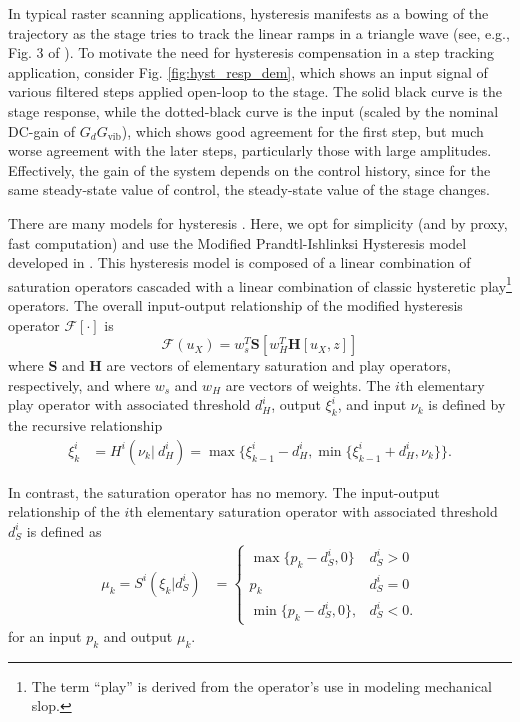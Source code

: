 \documentclass[twocolumn,twoside]{IEEEtran}
\newcommand{\Gv}{\ensuremath{G_{\text{vib}}}\xspace}
\begin{document}
In typical raster scanning applications, hysteresis manifests as a bowing of the trajectory as the stage tries to track the linear ramps in a triangle wave (see, e.g., Fig. 3 of \cite{Leang_IEEECS_2009}). To motivate the need for hysteresis compensation in a step tracking application, consider Fig. \ref{fig:hyst_resp_dem}, which shows an input signal of various filtered steps applied open-loop to the stage. The solid black curve is the stage response, while the dotted-black curve is the input (scaled by the nominal DC-gain of $G_d\Gv$), which shows good agreement for the first step, but much worse agreement with the later steps, particularly those with large amplitudes. Effectively, the gain of the system depends on the control history, since for the same steady-state value of control, the steady-state value of the stage changes.

There are many models for hysteresis \cite{croft_creep_1999, rakotondrabe_bouc_2011, Lui_hysteresis_2013}. Here, we opt for simplicity (and by proxy, fast computation) and use the Modified Prandtl-Ishlinksi Hysteresis model developed in \cite{kuhnen_modeling_2003}. This hysteresis model is composed of a linear combination of saturation operators cascaded with a linear combination of classic hysteretic play\footnote{The term ``play'' is derived from the operator's use in modeling mechanical slop.} operators. The overall input-output relationship of the modified hysteresis operator $\mathcal{F}[\cdot]$ is
\begin{equation}
  \mathcal{F}(u_X) = w_s^T\mathbf{S}\left[w_H^T \mathbf{H}[u_X, z]\right]\nonumber
\end{equation}
where $\mathbf{S}$ and $\mathbf{H}$ are vectors of elementary saturation and play operators, respectively, and
where $w_s$ and $w_H$ are vectors of weights. The $i$th elementary play operator with associated threshold $d_H^i$, output $\xi_k^i$, and input $\nu_k$ is defined by the recursive relationship
\begin{align}
  \xi^i_k &=
  H^i(\nu_k|\: d_H^i) =
  \max\{\xi^i_{k-1}-d_H^i, \min\{\xi^i_{k-1} + d_H^i, \nu_k\} \}.\nonumber
\end{align}

In contrast, the saturation operator has no memory. The input-output relationship of the $i$th elementary saturation operator with associated threshold $d_S^i$ is defined as
\begin{align}
  \mu_k=
  S^i(\xi_k| d_S^i) &=
  \begin{cases}
    \max\{p_k - d_S^i, 0\} & d_S^i >0\nonumber\\
    p_k & d_S^i = 0\nonumber\\
    \min\{p_k-d_S^i, 0\},  & d_S^i<0.\nonumber
  \end{cases}
\end{align}
for an input $p_k$ and output $\mu_k$. 
\end{document}
